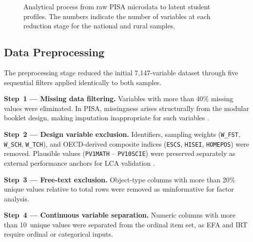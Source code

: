 \documentclass[twocolumn,12pt]{article}
\begin{document}

\begin{figure}[ht]
\centering

\caption{Analytical process from raw PISA microdata to latent student profiles. The numbers indicate the number of variables at each reduction stage for the national and rural samples.}
\label{fig:pipeline}
\end{figure}


\subsection{Data Preprocessing}

The preprocessing stage reduced the initial 7,147-variable dataset through
five sequential filters applied identically to both samples.

\textbf{Step~1 --- Missing data filtering.} Variables with more than 40\%
missing values were eliminated. In PISA, missingness arises structurally
from the modular booklet design, making imputation inappropriate for such
variables \parencite{oecd2023technical}.

\textbf{Step~2 --- Design variable exclusion.} Identifiers, sampling
weights (\texttt{W\_FST}, \texttt{W\_SCH}, \texttt{W\_TCH}), and
OECD-derived composite indices (\texttt{ESCS}, \texttt{HISEI},
\texttt{HOMEPOS}) were removed. Plausible values (\texttt{PV1MATH} --
\texttt{PV10SCIE}) were preserved separately as external performance anchors
for LCA validation \parencite{vondavier2009plausible}.

\textbf{Step~3 --- Free-text exclusion.} Object-type columns with more
than 20\% unique values relative to total rows were removed as
uninformative for factor analysis.

\textbf{Step~4 --- Continuous variable separation.} Numeric columns with
more than 10~unique values were separated from the ordinal item set, as EFA
and IRT require ordinal or categorical inputs.
\end{document}
